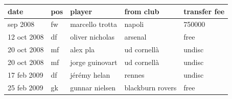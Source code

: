 \documentclass{article}
\begin{document}
\begin{tabular}{lllll}
\toprule
date & pos & player & from club & transfer fee \\
\midrule
sep 2008 & fw & marcello trotta & napoli & 750000 \\
12 oct 2008 & df & oliver nicholas & arsenal & free \\
20 oct 2008 & mf & alex pla & ud cornellà & undisc \\
20 oct 2008 & mf & jorge guinovart & ud cornellà & undisc \\
17 feb 2009 & df & jérémy helan & rennes & undisc \\
25 feb 2009 & gk & gunnar nielsen & blackburn rovers & free \\
\bottomrule
\end{tabular}
\end{document}
